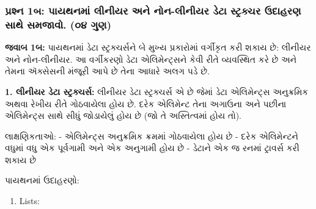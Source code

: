 \begin{Shaded}
\begin{Highlighting}[]
\end{Highlighting}
\end{Shaded}

\hypertarget{uxaaauxab0uxab6uxaa8-1uxaac-uxaaauxaafuxaa5uxaa8uxaae-uxab2uxaa8uxaafuxab0-uxa85uxaa8-uxaa8uxaa8-uxab2uxaa8uxaafuxab0-uxaa1uxa9f-uxab8uxa9fuxab0uxa95uxa9auxab0-uxa89uxaa6uxab9uxab0uxaa3-uxab8uxaa5-uxab8uxaaeuxa9cuxab5.-uxae6uxaea-uxa97uxaa3}{%
\subsubsection{પ્રશ્ન 1બ: પાયથનમાં લીનીયર અને નોન-લીનીયર ડેટા સ્ટ્રક્ચર ઉદાહરણ
સાથે સમજાવો. (૦૪
ગુણ)}\label{uxaaauxab0uxab6uxaa8-1uxaac-uxaaauxaafuxaa5uxaa8uxaae-uxab2uxaa8uxaafuxab0-uxa85uxaa8-uxaa8uxaa8-uxab2uxaa8uxaafuxab0-uxaa1uxa9f-uxab8uxa9fuxab0uxa95uxa9auxab0-uxa89uxaa6uxab9uxab0uxaa3-uxab8uxaa5-uxab8uxaaeuxa9cuxab5.-uxae6uxaea-uxa97uxaa3}}

\textbf{જવાબ 1બ:} પાયથનમાં ડેટા સ્ટ્રક્ચર્સને બે મુખ્ય પ્રકારોમાં વર્ગીકૃત કરી શકાય છે:
લીનીયર અને નોન-લીનીયર. આ વર્ગીકરણો ડેટા એલિમેન્ટ્સને કેવી રીતે વ્યવસ્થિત કરે છે અને
તેમના ઍક્સેસની મંજૂરી આપે છે તેના આધારે અલગ પડે છે.

\textbf{1. લીનીયર ડેટા સ્ટ્રક્ચર્સ:} લીનીયર ડેટા સ્ટ્રક્ચર્સ એ છે જેમાં ડેટા એલિમેન્ટ્સ
અનુક્રમિક અથવા રેખીય રીતે ગોઠવાયેલા હોય છે. દરેક એલિમેન્ટ તેના અગાઉના અને પછીના
એલિમેન્ટ્સ સાથે સીધું જોડાયેલું હોય છે (જો તે અસ્તિત્વમાં હોય તો).

લાક્ષણિકતાઓ: - એલિમેન્ટ્સ અનુક્રમિક ક્રમમાં ગોઠવાયેલા હોય છે - દરેક એલિમેન્ટને વધુમાં વધુ
એક પૂર્વગામી અને એક અનુગામી હોય છે - ડેટાને એક જ રનમાં ટ્રાવર્સ કરી શકાય છે

પાયથનમાં ઉદાહરણો:

\begin{enumerate}
\def\labelenumi{\alph{enumi})}
\tightlist
\item
  Lists:
\end{enumerate}

